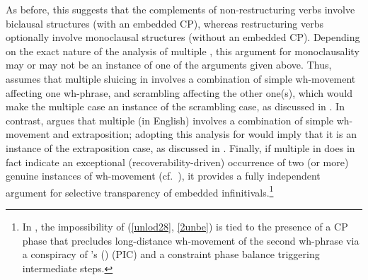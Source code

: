 \documentclass[output=paper]{langsci/langscibook}
\newcommand{\scite}[2]{\citeauthor{#2}#1 (\citeyear{#2})}
\begin{document}
\ea\label{ex:4} 
    \z
\z

\largerpage[-1]
As before, this suggests that the complements of non-restructuring verbs
involve biclausal structures (with an embedded CP), whereas  restructuring
verbs optionally involve monoclausal structures (without an embedded CP).
Depending on the exact nature of the analysis of multiple , this
argument for monoclausality may or may not be an instance of one of the
arguments given above. Thus, \citet{Sauerland:99:loc} assumes that multiple
sluicing in  involves a combination of simple wh-movement affecting one
wh-phrase, and scrambling affecting the other one(s), which would make the
multiple  case an instance of the scrambling case, as discussed in
. In contrast, \citet{Lasnik:14:mul} argues that multiple  (in
English) involves a combination of simple wh-movement and extraposition;
adopting this analysis for  would imply that it is an instance of the
extraposition case, as discussed in .  Finally, if multiple 
in  does in fact indicate an exceptional (recoverability-driven)
occurrence of two (or more) genuine instances of wh-movement (cf.\
\citealt{Merchant2001,Heck&Mueller:03:vers}), it provides a fully
independent argument for selective transparency of embedded
infinitivals.\footnote{In \citet{Heck&Mueller:03:vers}, the impossibility of
    (\ref{unlod28}, \ref{2unbe}) is tied to the presence of a CP phase that
    precludes long-distance wh-movement of the second wh-phrase via a
    conspiracy of \scite{'s}{Chomsky2001} 
(\glsunset{PIC}\gls{PIC}) and a constraint phase balance triggering
intermediate \isi{movement} steps.}
\end{document}
